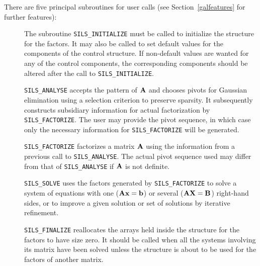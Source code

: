 \documentclass{galahad}
\newcommand{\packagename}{SILS}
\begin{document}
\noindent There are five principal subroutines for user calls (see 
Section~\ref{galfeatures} for further features): 
 
\begin{description} 
 
\item[] The subroutine {\tt \packagename\_INITIALIZE} must be called to 
initialize the 
structure for the factors. It may also be called to set default values 
for the components of the control structure. If non-default values are 
wanted for any of the control components, the corresponding components 
should be altered after the call to {\tt \packagename\_INITIALIZE}. 
  
\item[] {\tt \packagename\_ANALYSE} accepts the pattern of ${\mathbf{A}}$ 
 and chooses  pivots 
 for Gaussian elimination using a selection criterion to preserve 
 sparsity.  It subsequently constructs subsidiary information for 
 actual factorization by {\tt \packagename\_FACTORIZE}. The user may provide
 the pivot sequence, in which case only the necessary information for 
 {\tt \packagename\_FACTORIZE} will be generated. 
 
\item[] {\tt \packagename\_FACTORIZE} factorizes a matrix ${\mathbf{A}}$ using the 
information 
 from a previous call to {\tt \packagename\_ANALYSE}. The actual pivot sequence 
 used may differ from that of {\tt \packagename\_ANALYSE} if ${\mathbf{A}}$ is not 
definite. 
 
\item[] {\tt \packagename\_SOLVE} uses the factors generated by 
  {\tt \packagename\_FACTORIZE} to 
  solve a system of equations with one (${\mathbf{A}} {\mathbf{x}} = {\mathbf{b}}$) 
  or several (${\mathbf{A}} {\mathbf{X}} = {\mathbf{B}}$) right-hand sides, 
  or to improve a given solution or set of solutions 
  by iterative refinement. 
 
\item[] {\tt \packagename\_FINALIZE} reallocates the arrays held inside the  
  structure for the factors to have size zero. It should be called 
  when all the systems involving its matrix have been solved unless 
  the structure is about to be used for the factors of another matrix. 
  
\end{description} 





\end{document}
